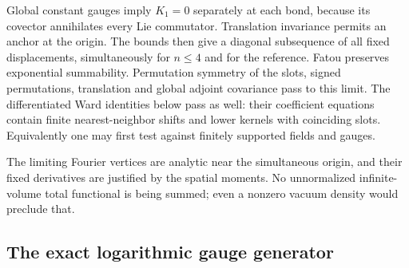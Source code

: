 Global constant gauges imply \(K_1=0\) separately at each bond,
because its covector annihilates every Lie commutator. Translation
invariance permits an anchor at the origin. The bounds then give a
diagonal subsequence of all fixed displacements, simultaneously for
\(n\le4\) and for the reference. Fatou preserves exponential
summability. Permutation symmetry of the slots, signed permutations,
translation and global adjoint covariance pass to this limit.
The differentiated Ward identities below pass as well: their
coefficient equations contain finite nearest-neighbor shifts and
lower kernels with coinciding slots. Equivalently one may first
test against finitely supported fields and gauges.

The limiting Fourier vertices are analytic near the simultaneous
origin, and their fixed derivatives are justified by the spatial
moments. No unnormalized infinite-volume total functional is being
summed; even a nonzero vacuum density would preclude that.

\subsection{The exact logarithmic gauge generator}
\label{tkw-generator-section}

